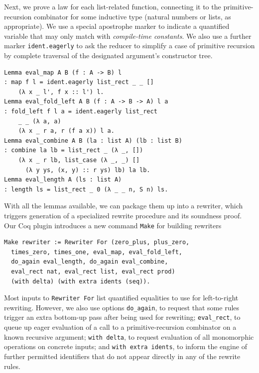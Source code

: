 Next, we prove a law for each list-related function, connecting it to the primitive-recursion combinator for some inductive type (natural numbers or lists, as appropriate).
We use a special apostrophe marker to indicate a quantified variable that may only match with \emph{compile-time constants}.
We also use a further marker \texttt{ident.eagerly} to ask the reducer to simplify a case of primitive recursion by complete traversal of the designated argument's constructor tree.
\begin{verbatim}
Lemma eval_map A B (f : A -> B) l
: map f l = ident.eagerly list_rect _ _ []
    (λ x _ l', f x :: l') l.
Lemma eval_fold_left A B (f : A -> B -> A) l a
: fold_left f l a = ident.eagerly list_rect
    _ _ (λ a, a)
    (λ x _ r a, r (f a x)) l a.
Lemma eval_combine A B (la : list A) (lb : list B)
: combine la lb = list_rect _ (λ _, [])
    (λ x _ r lb, list_case (λ _, _) []
      (λ y ys, (x, y) :: r ys) lb) la lb.
Lemma eval_length A (ls : list A)
: length ls = list_rect _ 0 (λ _ _ n, S n) ls.
\end{verbatim}

With all the lemmas available, we can package them up into a rewriter, which triggers generation of a specialized rewrite procedure and its soundness proof.
Our Coq plugin introduces a new command \texttt{Make} for building rewriters
\begin{verbatim}
Make rewriter := Rewriter For (zero_plus, plus_zero,
  times_zero, times_one, eval_map, eval_fold_left,
  do_again eval_length, do_again eval_combine,
  eval_rect nat, eval_rect list, eval_rect prod)
  (with delta) (with extra idents (seq)).
\end{verbatim}
Most inputs to \texttt{Rewriter For} list quantified equalities to use for left-to-right rewriting.
However, we also use options \texttt{do_again}, to request that some rules trigger an extra bottom-up pass after being used for rewriting; \texttt{eval_rect}, to queue up eager evaluation of a call to a primitive-recursion combinator on a known recursive argument; \texttt{with delta}, to request evaluation of all monomorphic operations on concrete inputs; and \texttt{with extra idents}, to inform the engine of further permitted identifiers that do not appear directly in any of the rewrite rules.

